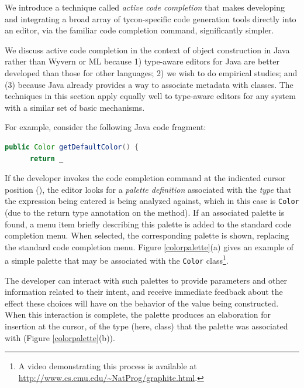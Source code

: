 \begin{contribution}
We introduce a technique called {\it active code completion} that  makes developing and integrating a broad array of tycon-specific code generation tools directly into an editor, via the familiar code completion command, significantly simpler.%

 We discuss active code completion in the context of object construction in Java rather than Wyvern or ML because 1) type-aware editors for Java are better developed than those for other languages; 2) we wish to do empirical studies; and (3) because Java already provides a way to associate metadata with classes. The techniques in this section apply equally well to type-aware editors for any system with a similar set of basic mechanisms. 

For example, consider the following Java code fragment:
\begin{lstlisting}[language=Java,numbers=none]
  public Color getDefaultColor() {
      return _
\end{lstlisting}
If the developer invokes the code completion command at the indicated cursor position (\li{_}), the editor  looks  for a {\it palette definition} associated with the {\it type} that the expression being entered is being analyzed against, which in this case is  \verb|Color| (due to the return type annotation on the method). If an associated palette is found, a menu item briefly describing this palette is added to the standard code completion menu. When selected, the corresponding palette is shown, replacing the standard code completion menu. Figure \ref{colorpalette}(a) gives an example of a simple palette that may be associated with the \verb|Color| class\footnote{A video demonstrating this process is available at \url{http://www.cs.cmu.edu/~NatProg/graphite.html}.}. 

The developer can interact with such palettes to provide parameters and other information related to their intent, and receive immediate feedback about the effect these choices will have on the behavior of the value being constructed. When this interaction is complete, the palette produces an elaboration for insertion at the cursor, of the type (here, class) that the palette was associated with (Figure \ref{colorpalette}(b)).


\end{contribution}
